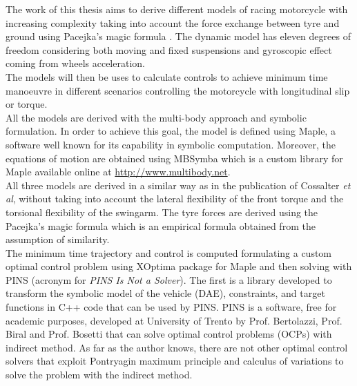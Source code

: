 %
The work of this thesis aims to derive different models of racing motorcycle with increasing complexity taking into account the force exchange between tyre and ground using Pacejka's magic formula \cite{pacejka2006tyre}. The dynamic model has eleven degrees of freedom considering both moving and fixed suspensions and gyroscopic effect coming from wheels acceleration.\\ 
The models will then be uses to calculate controls to achieve minimum time manoeuvre in different scenarios controlling the motorcycle with longitudinal slip or torque.\\
%
%
All the models are derived with the multi-body approach and symbolic formulation. In order to achieve this goal, the model is defined using Maple, a software well known for its capability in symbolic computation. Moreover, the equations of motion are obtained using MBSymba which is a custom library for Maple available online at \url{http://www.multibody.net}.\\
All three models are derived in a similar way as in the publication of Cossalter \textit{et al}\cite{cossalter2007influence}, without taking into account the lateral flexibility of the front torque and the torsional flexibility of the swingarm. The tyre forces are derived using the Pacejka's magic formula \cite{pacejka2006tyre} which is an empirical formula obtained from the assumption of similarity.\\
The minimum time trajectory and control is computed formulating a custom optimal control problem using XOptima package for Maple and then solving with PINS (acronym for \textit{PINS Is Not a Solver}). The first is a library developed to transform the symbolic model of the vehicle (DAE), constraints, and target functions in C++ code that can be used by PINS. PINS is a software, free for academic purposes, developed at University of Trento by Prof. Bertolazzi, Prof. Biral and Prof. Bosetti that can solve optimal control problems (OCPs) with indirect method. As far as the author knows, there are not other optimal control solvers that exploit Pontryagin maximum principle and calculus of variations to solve the problem with the indirect method. \cite{bertolazzi2006symbolic}\\
